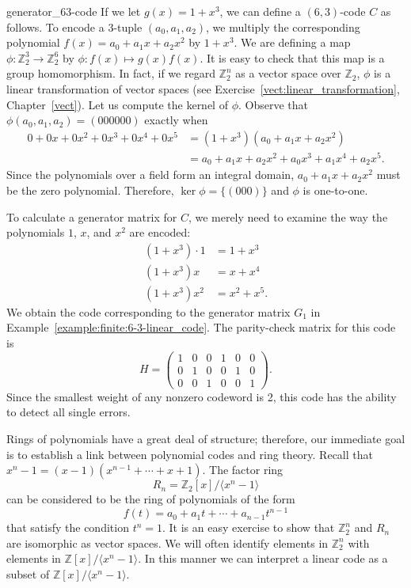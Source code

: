 \begin{example}{generator_63-code}
If we let $g(x)= 1 + x^3$, we can define a $(6,3)$-code $C$ as follows.  To encode a 3-tuple $( a_0, a_1, a_2 )$, we multiply the corresponding polynomial $f(x) = a_0 + a_1 x + a_2 x^2$ by $1 + x^3$.  We are defining a map $\phi : {\mathbb Z}_2^3 \rightarrow {\mathbb Z}_2^6$ by $\phi  : f(x) \mapsto g(x) f(x)$.  It is easy to check that this map is a group homomorphism.  In fact, if we regard ${\mathbb Z}_2^n$ as a vector space over ${\mathbb Z}_2$, $\phi$ is a linear transformation of vector spaces (see Exercise~\ref{vect:linear_transformation}, Chapter~\ref{vect}).  Let us compute the kernel of $\phi$.  Observe that $\phi ( a_0, a_1, a_2 ) = (000000)$ exactly when 
\begin{align*}
0 + 0x + 0x^2 + 0x^3 + 0x^4 + 0 x^5 
& = (1 + x^3) ( a_0 + a_1 x + a_2 x^2 ) \\ 
& = a_0 + a_1 x + a_2 x^2 + a_0 x^3 + a_1 x^4 + a_2 x^5.
\end{align*}
Since the polynomials over a field form an integral domain, $a_0 + a_1 x + a_2 x^2$ must be the zero polynomial. Therefore, $\ker \phi = \{ (000) \}$ and $\phi$ is one-to-one. 
 

To calculate a generator matrix for $C$, we merely need to examine the way the polynomials $1$, $x$, and $x^2$ are encoded:
\begin{align*}
(1 + x^3) \cdot 1 & = 1 + x^3 \\
(1 + x^3)x & = x + x^4 \\
(1 + x^3)x^2 & = x^2 + x^5. 
\end{align*}  %
We obtain the code corresponding to the generator matrix $G_1$ in Example~\ref{example:finite:6-3-linear_code}.  The parity-check matrix for this code is
\[
H
= 
\begin{pmatrix}
1 & 0 & 0 & 1 & 0 & 0 \\
0 & 1 & 0 & 0 & 1 & 0 \\
0 & 0 & 1 & 0 & 0 & 1 
\end{pmatrix}.
\]
Since the smallest weight of any nonzero codeword is 2, this code has the ability to detect all single errors.  
\end{example}


Rings of polynomials have a great deal of structure; therefore, our immediate goal is to establish a link between polynomial codes and ring theory. Recall that $x^n - 1 = (x - 1)( x^{n-1} + \cdots + x + 1)$.  The factor ring 
\[
R_n = {\mathbb Z}_2[x]/ \langle x^n - 1 \rangle
\] 
can be considered to be the ring of polynomials of the form 
\[
f(t) = a_0 + a_1 t + \cdots + a_{n-1} t^{n-1}
\]
that satisfy the condition $t^n = 1$.  It is an easy exercise to show that ${\mathbb Z}_2^n$ and $R_n$ are isomorphic as vector spaces.  We will often identify elements in ${\mathbb Z}_2^n$ with elements in
${\mathbb Z}[x] / \langle x^n - 1 \rangle$.  In this manner we can interpret a linear code as a subset of ${\mathbb Z}[x] / \langle x^n - 1 \rangle$.  

